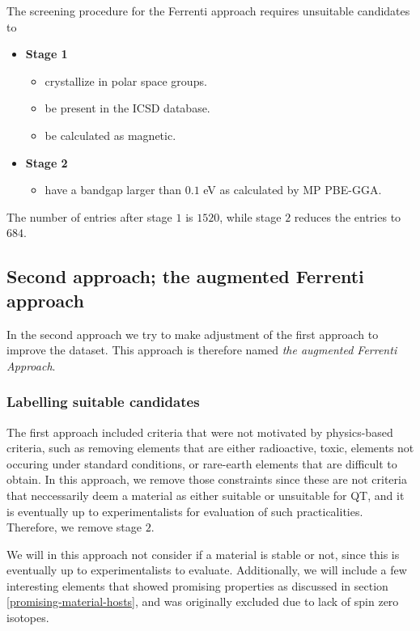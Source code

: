The screening procedure for the Ferrenti approach requires unsuitable candidates to

\begin{itemize}
  \item[]{\textbf{Stage 1}}
  \begin{itemize}
  \item crystallize in polar space groups.
  \item be present in the ICSD database.
  \item be calculated as magnetic.
  \end{itemize}
  \item[]{\textbf{Stage 2}}
  \begin{itemize}
  \item have a bandgap larger than $0.1$ eV as calculated by MP PBE-GGA.
  \end{itemize}
\end{itemize}

The number of entries after stage $1$ is $1520$, while stage $2$ reduces the entries to $684$.

\subsection{Second approach; the augmented Ferrenti approach}

In the second approach we try to make adjustment of the first approach to improve the dataset. This approach is therefore named \textit{the augmented Ferrenti Approach}.

\subsubsection{Labelling suitable candidates}

The first approach included criteria that were not motivated by physics-based criteria, such as removing elements that are either radioactive, toxic, elements not occuring under standard conditions, or rare-earth elements that are difficult to obtain. In this approach, we remove those constraints since these are not criteria that neccessarily deem a material as either suitable or unsuitable for QT, and it is eventually up to experimentalists for evaluation of such practicalities. Therefore, we remove stage $2$.

We will in this approach not consider if a material is stable or not, since this is eventually up to experimentalists to evaluate. Additionally, we will include a few interesting elements that showed promising properties as discussed in section \autoref{promising-material-hosts}, and was originally excluded due to lack of spin zero isotopes.

